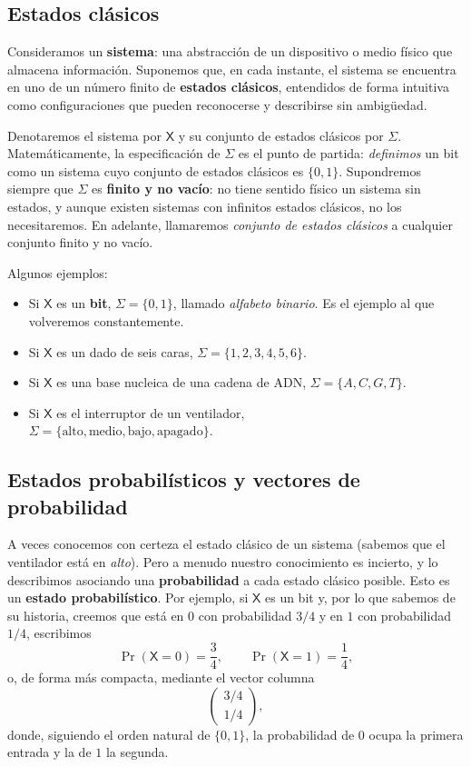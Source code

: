 \documentclass[11pt, a4paper, twoside, openright]{report}
\begin{document}
\subsection{Estados clásicos}

\noindent Consideramos un \textbf{sistema}: una abstracción de un dispositivo o medio físico que almacena información. Suponemos que, en cada instante, el sistema se encuentra en uno de un número finito de \textbf{estados clásicos}, entendidos de forma intuitiva como configuraciones que pueden reconocerse y describirse sin ambigüedad.

\noindent Denotaremos el sistema por $\mathsf{X}$ y su conjunto de estados clásicos por $\Sigma$. Matemáticamente, la especificación de $\Sigma$ es el punto de partida: \textit{definimos} un bit como un sistema cuyo conjunto de estados clásicos es $\{0,1\}$. Supondremos siempre que $\Sigma$ es \textbf{finito y no vacío}: no tiene sentido físico un sistema sin estados, y aunque existen sistemas con infinitos estados clásicos, no los necesitaremos. En adelante, llamaremos \textit{conjunto de estados clásicos} a cualquier conjunto finito y no vacío.

\noindent Algunos ejemplos:
\begin{itemize}
    \item Si $\mathsf{X}$ es un \textbf{bit}, $\Sigma = \{0, 1\}$, llamado \textit{alfabeto binario}. Es el ejemplo al que volveremos constantemente.
    \item Si $\mathsf{X}$ es un dado de seis caras, $\Sigma = \{1, 2, 3, 4, 5, 6\}$.
    \item Si $\mathsf{X}$ es una base nucleica de una cadena de ADN, $\Sigma = \{A, C, G, T\}$.
    \item Si $\mathsf{X}$ es el interruptor de un ventilador, \\ $\Sigma = \{\text{alto}, \text{medio}, \text{bajo}, \text{apagado}\}$.
\end{itemize}

\subsection{Estados probabilísticos y vectores de probabilidad}

\noindent A veces conocemos con certeza el estado clásico de un sistema (sabemos que el ventilador está en \textit{alto}). Pero a menudo nuestro conocimiento es incierto, y lo describimos asociando una \textbf{probabilidad} a cada estado clásico posible. Esto es un \textbf{estado probabilístico}. Por ejemplo, si $\mathsf{X}$ es un bit y, por lo que sabemos de su historia, creemos que está en $0$ con probabilidad $3/4$ y en $1$ con probabilidad $1/4$, escribimos
\[ \Pr(\mathsf{X} = 0) = \frac{3}{4}, \qquad \Pr(\mathsf{X} = 1) = \frac{1}{4}, \]
o, de forma más compacta, mediante el vector columna
\[ \begin{pmatrix} 3/4 \\ 1/4 \end{pmatrix}, \]
donde, siguiendo el orden natural de $\{0,1\}$, la probabilidad de $0$ ocupa la primera entrada y la de $1$ la segunda.
\end{document}
